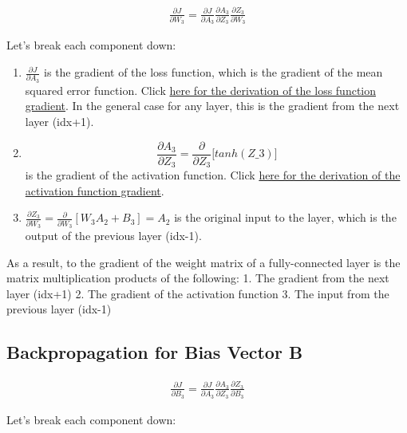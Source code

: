 \documentclass[11pt]{article}
\begin{document}
\begin{align*}
\frac{\partial J}{\partial W_3} = \frac{\partial J}{\partial A_3} \frac{\partial A_3}{\partial Z_3} \frac{\partial Z_3}{\partial W_3}
\end{align*}

Let's break each component down:

\begin{enumerate}
\def\labelenumi{\arabic{enumi}.}
\item
  \(\frac{\partial J}{\partial A_3}\) is the gradient of the loss
  function, which is the gradient of the mean squared error function.
  Click
  \hyperref[mean-squared-error-gradient]{here for the derivation of the loss function gradient}.
  In the general case for any layer, this is the gradient from the next
  layer (idx+1).
\item
  \[\frac{\partial A_3}{\partial Z_3} =
  \frac{\partial}{\partial Z_3}{[}tanh(Z\_3){]} \] is the gradient of
  the activation function. Click
  \hyperref[tanh-activation-function-gradient]{here for the derivation of the activation function gradient}.
\item
  \(\frac{\partial Z_3}{\partial W_3} = \frac{\partial}{\partial W_3}[W_3 A_2 + B_3] = A_2\)
  is the original input to the layer, which is the output of the
  previous layer (idx-1).
\end{enumerate}

As a result, to the gradient of the weight matrix of a fully-connected
layer is the matrix multiplication products of the following: 1. The
gradient from the next layer (idx+1) 2. The gradient of the activation
function 3. The input from the previous layer (idx-1)

    \subsection{Backpropagation for Bias Vector
B}\label{backpropagation-for-bias-vector-b}

\begin{align*}
\frac{\partial J}{\partial B_3} = \frac{\partial J}{\partial A_3} \frac{\partial A_3}{\partial Z_3} \frac{\partial Z_3}{\partial B_3}
\end{align*}

Let's break each component down:
\end{document}
